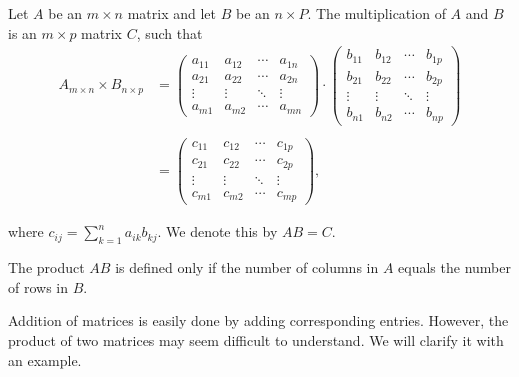 \documentclass{subfile}
\begin{document}
	\begin{definition}\label{def:matrixproduct}
		Let $A$ be an $m\times n$ matrix and let $B$ be an $n\times P$. The multiplication of $A$ and $B$ is an $m \times p$ matrix $C$, such that
		\begin{align*}
		{A_{m \times n}} \times {B_{n \times p}} &= \begin{pmatrix}
			{{a_{11}}}&{{a_{12}}}& \cdots &{{a_{1n}}}\\
			{{a_{21}}}&{{a_{22}}}& \cdots &{{a_{2n}}}\\
			\vdots & \vdots & \ddots & \vdots \\
			{{a_{m1}}}&{{a_{m2}}}& \cdots &{{a_{mn}}}
				\end{pmatrix} \cdot \begin{pmatrix}
			{{b_{11}}}&{{b_{12}}}& \cdots &{{b_{1p}}}\\
			{{b_{21}}}&{{b_{22}}}& \cdots &{{b_{2p}}}\\
			\vdots & \vdots & \ddots & \vdots \\
			{{b_{n1}}}&{{b_{n2}}}& \cdots &{{b_{np}}}
			\end{pmatrix}\\
		\\
		&= \begin{pmatrix}
			{{c_{11}}}&{{c_{12}}}& \cdots &{{c_{1p}}}\\
			{{c_{21}}}&{{c_{22}}}& \cdots &{{c_{2p}}}\\
			\vdots & \vdots & \ddots & \vdots \\
			{{c_{m1}}}&{{c_{m2}}}& \cdots &{{c_{mp}}}
		\end{pmatrix},
		\end{align*}
		
		where $c_{ij}= \displaystyle\sum_{k=1}^{n} a_{ik}b_{kj}$. We denote this by $AB=C$.
	\end{definition}
	
	
	\begin{note}
		The product $AB$ is defined only if the number of columns in $A$ equals the number of rows in $B$.
	\end{note}
	
	
Addition of matrices is easily done by adding corresponding entries. However, the product of two matrices may seem difficult to understand. We will clarify it with an example.
\end{document}

